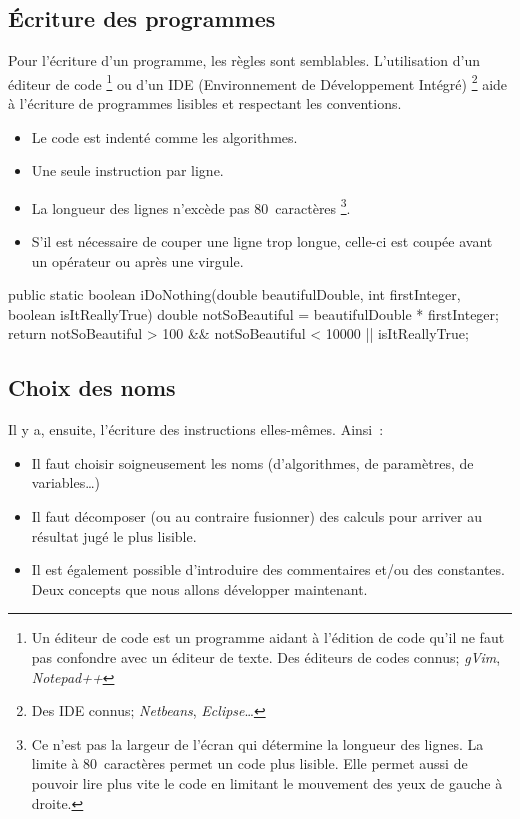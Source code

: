 		\subsection{Écriture des programmes}

			Pour l'écriture d'un programme, les règles sont semblables.
			L'utilisation d'un éditeur de code%
			\footnote{%
				Un éditeur de code est un programme aidant à l'édition de code
				qu'il ne faut pas confondre avec un éditeur de texte. Des
				éditeurs de codes connus; \textit{gVim}, \textit{Notepad++}
			} ou d'un IDE (Environnement de Développement Intégré)%
			\footnote{
				Des IDE connus; \textit{Netbeans}, \textit{Eclipse}…
			}
			aide à l'écriture de programmes lisibles et respectant les
			conventions. 
		
			\begin{itemize}
				\item Le code est indenté comme les algorithmes.
				\item Une seule instruction par ligne.
				\item La longueur des lignes n'excède pas 80 caractères%
					\footnote{
						Ce n'est pas la largeur de l'écran qui détermine la 
						longueur des lignes. La limite à 80 caractères permet 
						un code plus lisible. Elle permet aussi de pouvoir lire
						plus vite le code en limitant le mouvement des yeux de 
						gauche à droite. 
					}.
				\item S'il est nécessaire de couper une ligne trop longue, 
					celle-ci est coupée avant un opérateur ou après une virgule.
			\end{itemize}

			\begin{java}
public static boolean iDoNothing(double beautifulDouble, 
		int firstInteger, boolean isItReallyTrue){
	double notSoBeautiful = beautifulDouble * firstInteger; 
	return notSoBeautiful > 100 && notSoBeautiful < 10000
		|| isItReallyTrue;
}
			\end{java}


		\subsection{Choix des noms}
			
			Il y a, ensuite, l’écriture des instructions elles-mêmes.
			Ainsi~:
			\begin{itemize}
			\item
				Il faut choisir soigneusement les noms 
				(d’algorithmes, de paramètres, de variables\dots)
			\item
				Il faut décomposer (ou au contraire fusionner)
				des calculs pour arriver au résultat jugé
				le plus lisible.
			\item 
				Il est également possible d'introduire des commentaires et/ou
				des constantes. Deux concepts que nous allons développer 
				maintenant.
			\end{itemize}
			
